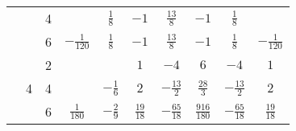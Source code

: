 \begin{table}[H]
\begin{tabular}{|c|c|c|c|c|c|c|c|c|c|}
                                                      &                              & 4                           &                  & $\frac{1}{8}$    & $-1$            & $\frac{13}{8}$   & $-1$              & $\frac{1}{8}$      &                  \\ \cline{3-10}
                                                      &                              & 6                           & $-\frac{1}{120}$ & $\frac{1}{8}$    & $-1$            & $\frac{13}{8}$   & $-1$              & $\frac{1}{8}$      & $-\frac{1}{120}$ \\ \cline{2-10}
                                                      & \multirow{3}{*}{4}           & 2                           &                  &                  & $1$             & $-4$             & $6$               & $-4$               & $1$              \\ \cline{3-10}
                                                      &                              & 4                           &                  & $-\frac{1}{6}$   & $2$             & $-\frac{13}{2}$  & $\frac{28}{3}$    & $-\frac{13}{2}$    & $2$              \\ \cline{3-10}
                                                      &                              & 6                           & $\frac{1}{180}$  & $-\frac{2}{9}$   & $\frac{19}{18}$ & $-\frac{65}{18}$ & $\frac{916}{180}$ & $-\frac{65}{18}$   & $\frac{19}{18}$  \\ \hline


\end{tabular}
\end{table}
